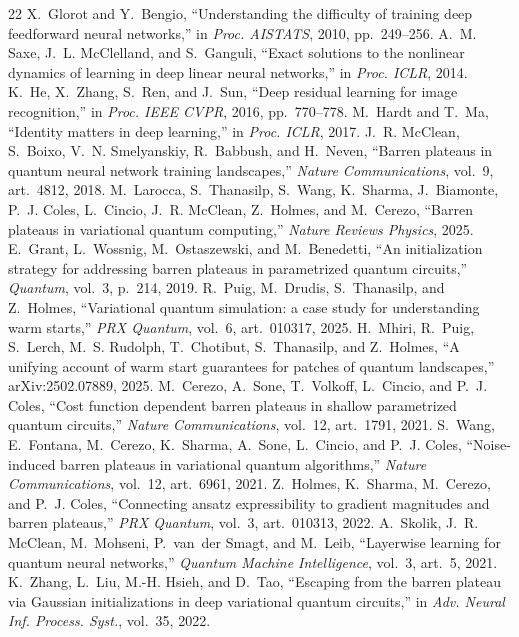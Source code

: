 \documentclass[conference]{IEEEtran}%
\begin{document}
\begin{thebibliography}{22}
 X.~Glorot and Y.~Bengio, ``Understanding the difficulty of training deep feedforward neural networks,'' in \emph{Proc. AISTATS}, 2010, pp.~249--256.
 A.~M. Saxe, J.~L. McClelland, and S.~Ganguli, ``Exact solutions to the nonlinear dynamics of learning in deep linear neural networks,'' in \emph{Proc. ICLR}, 2014.
 K.~He, X.~Zhang, S.~Ren, and J.~Sun, ``Deep residual learning for image recognition,'' in \emph{Proc. IEEE CVPR}, 2016, pp.~770--778.
 M.~Hardt and T.~Ma, ``Identity matters in deep learning,'' in \emph{Proc. ICLR}, 2017.
 J.~R. McClean, S.~Boixo, V.~N. Smelyanskiy, R.~Babbush, and H.~Neven, ``Barren plateaus in quantum neural network training landscapes,'' \emph{Nature Communications}, vol.~9, art.~4812, 2018.
 M.~Larocca, S.~Thanasilp, S.~Wang, K.~Sharma, J.~Biamonte, P.~J. Coles, L.~Cincio, J.~R. McClean, Z.~Holmes, and M.~Cerezo, ``Barren plateaus in variational quantum computing,'' \emph{Nature Reviews Physics}, 2025.
 E.~Grant, L.~Wossnig, M.~Ostaszewski, and M.~Benedetti, ``An initialization strategy for addressing barren plateaus in parametrized quantum circuits,'' \emph{Quantum}, vol.~3, p.~214, 2019.
 R.~Puig, M.~Drudis, S.~Thanasilp, and Z.~Holmes, ``Variational quantum simulation: a case study for understanding warm starts,'' \emph{PRX Quantum}, vol.~6, art.~010317, 2025.
 H.~Mhiri, R.~Puig, S.~Lerch, M.~S. Rudolph, T.~Chotibut, S.~Thanasilp, and Z.~Holmes, ``A unifying account of warm start guarantees for patches of quantum landscapes,'' arXiv:2502.07889, 2025.
 M.~Cerezo, A.~Sone, T.~Volkoff, L.~Cincio, and P.~J. Coles, ``Cost function dependent barren plateaus in shallow parametrized quantum circuits,'' \emph{Nature Communications}, vol.~12, art.~1791, 2021.
 S.~Wang, E.~Fontana, M.~Cerezo, K.~Sharma, A.~Sone, L.~Cincio, and P.~J. Coles, ``Noise-induced barren plateaus in variational quantum algorithms,'' \emph{Nature Communications}, vol.~12, art.~6961, 2021.
 Z.~Holmes, K.~Sharma, M.~Cerezo, and P.~J. Coles, ``Connecting ansatz expressibility to gradient magnitudes and barren plateaus,'' \emph{PRX Quantum}, vol.~3, art.~010313, 2022.
 A.~Skolik, J.~R. McClean, M.~Mohseni, P.~van~der Smagt, and M.~Leib, ``Layerwise learning for quantum neural networks,'' \emph{Quantum Machine Intelligence}, vol.~3, art.~5, 2021.
 K.~Zhang, L.~Liu, M.-H. Hsieh, and D.~Tao, ``Escaping from the barren plateau via Gaussian initializations in deep variational quantum circuits,'' in \emph{Adv. Neural Inf. Process. Syst.}, vol.~35, 2022.

\end{thebibliography}
\end{document}
